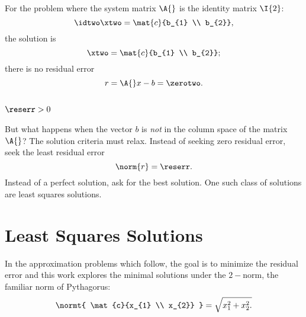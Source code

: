 For the problem where the system matrix $\A{}$ is the identity matrix $\I{2}$:
  \begin{equation*}   %
      \idtwo \xtwo = \mat{c}{b_{1} \\ b_{2}},
  \end{equation*}
the solution is
  \begin{equation*}   %
      \xtwo = \mat{c}{b_{1} \\ b_{2}} ;
  \end{equation*}
there is no residual error 
  \begin{equation*}   %
      r = \A{} x - b = \zerotwo .
  \end{equation*}

\subsection{$\reserr > 0$}  %
But what happens when the vector $b$ is \emph{not} in the column space of the matrix $\A{}$? The solution criteria must relax. Instead of seeking zero residual error, seek the least residual error
  \begin{equation*}   %
      \norm{r} = \reserr.
  \end{equation*}
Instead of a perfect solution, ask for the best solution. One such class of solutions are least squares solutions.

\section{Least Squares Solutions}  %
In the approximation problems which follow, the goal is to minimize the residual error and this work explores the minimal solutions under the $2-$norm, the familiar norm of Pythagorus:
  \begin{equation*}   %
      \normt{ \mat{c}{x_{1} \\ x_{2}} } = \sqrt{x_{1}^{2} + x_{2}^{2}.}
  \end{equation*}

